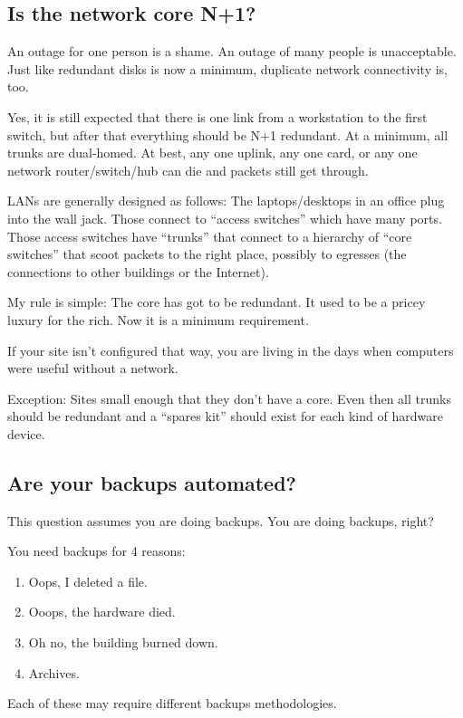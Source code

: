 \documentclass{article}
\begin{document}
\subsection{Is the network core N+1?}
An outage for one person is a shame. An outage of many people is unacceptable. Just like redundant disks is now a minimum, duplicate network connectivity is, too.

Yes, it is still expected that there is one link from a workstation to the first switch, but after that everything should be N+1 redundant. At a minimum, all trunks are dual-homed. At best, any one uplink, any one card, or any one network router/switch/hub can die and packets still get through.

LANs are generally designed as follows: The laptops/desktops in an office plug into the wall jack. Those connect to ``access switches'' which have many ports. Those access switches have ``trunks'' that connect to a hierarchy of ``core switches'' that scoot packets to the right place, possibly to egresses (the connections to other buildings or the Internet).

My rule is simple: The core has got to be redundant. It used to be a pricey luxury for the rich. Now it is a minimum requirement.

If your site isn't configured that way, you are living in the days when computers were useful without a network.

Exception: Sites small enough that they don't have a core. Even then all trunks should be redundant and a ``spares kit'' should exist for each kind of hardware device.

\subsection{Are your backups automated?}
This question assumes you are doing backups. You are doing backups, right?

You need backups for 4 reasons:

\begin{enumerate}
    \item Oops, I deleted a file.
    \item Ooops, the hardware died.
    \item Oh no, the building burned down.
    \item Archives.
\end{enumerate}

Each of these may require different backups methodologies.
\end{document}
